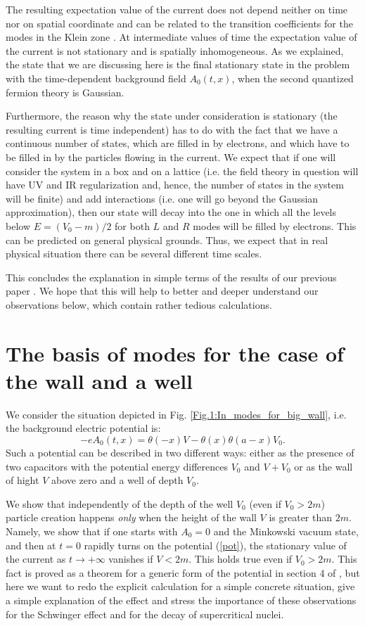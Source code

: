 \documentclass[12pt]{article}
\newcommand\beq{\begin{equation}}
\newcommand\eeq{\end{equation}}
\begin{document}
The resulting expectation value of the current does not depend neither on time nor on spatial coordinate and can be related to the transition coefficients for the modes in the Klein zone \cite{Akhmedov:2025jtk}. At intermediate values of time the expectation value of the current is not stationary and is spatially inhomogeneous. As we explained, the state that we are discussing here is the final stationary state in the problem with the time-dependent background field $A_0(t,x)$, when the second quantized fermion theory is Gaussian.

Furthermore, the reason why the state under consideration is stationary (the resulting current is time independent) has to do with the fact that we have a continuous number of states, which are filled in by electrons, and which have to be filled in by the particles flowing in the current. We expect that if one will consider the system in a box and on a lattice (i.e. the field theory in question will have UV and IR regularization and, hence, the number of states in the system will be finite) and add interactions (i.e. one will go beyond the Gaussian approximation), then our state will decay into the one in which all the levels below $E = (V_0-m)/2$ for both $L$ and $R$ modes will be filled by electrons. This can be predicted on general physical grounds. Thus, we expect that in real physical situation there can be several different time scales.

This concludes the explanation in simple terms of the results of our previous paper \cite{Akhmedov:2025jtk}. We hope that this will help to better and deeper understand our observations below, which contain rather tedious calculations.
    
\section{The basis of modes for the case of the wall and a well}

We consider the situation depicted in Fig. \ref{Fig.1:In_modes_for_big_wall}, i.e. the background electric potential is:
	\beq\label{pot}
    -eA_0(t,x)=\theta(-x)V-\theta(x)\theta(a-x)V_0.
    \eeq
Such a potential can be described in two different ways: either as the presence of two capacitors with the potential energy differences $V_0$ and $V+V_0$ or as the wall of hight $V$ above zero and a well of depth $V_0$.

We show that independently of the depth of the well $V_0$ (even if $V_0 > 2m$) particle creation happens {\it only} when the height of the wall $V$ is greater than $2m$. Namely, we show that if one starts with $A_0=0$ and the Minkowski vacuum state, and then at $t=0$ rapidly turns on the potential (\ref{pot}), the stationary value of the current as $t\to +\infty$ vanishes if $V< 2m$. This holds true even if $V_0 > 2m$. This fact is proved as a theorem for a generic form of the potential in section 4 of \cite{Akhmedov:2025jtk}, but here we want to redo the explicit calculation for a simple concrete situation, give a simple explanation of the effect and stress the importance of these observations for the Schwinger effect and for the decay of supercritical nuclei. 
\end{document}
